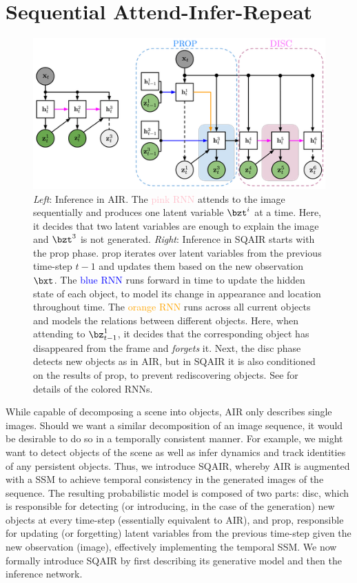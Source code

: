 \section{Sequential Attend-Infer-Repeat}
\label{sec:sqair}

\begin{figure}
    \centering
    \includegraphics[width=.7\linewidth]{figures/SQAIR/air_sqair_inference}
    \caption{
    \textit{Left}: 
        Inference in \gls{AIR}. 
        The \textcolor{pink}{pink \gls{RNN}} attends to the image sequentially and produces one latent variable $\bzt^i$ at a time. 
        Here, it decides that two latent variables are enough to explain the image and $\bzt^3$ is not generated.
    \textit{Right}:
        Inference in \gls{SQAIR} starts with the \gls{prop} phase.
        \gls{prop} iterates over latent variables from the previous time-step $t-1$ and updates them based on the new observation $\bxt$.
        The \textcolor{blue}{blue \gls{RNN}} runs forward in time to update the hidden state of each object, to model its change in appearance and location throughout time. 
        The \textcolor{orange}{orange \gls{RNN}} runs across all current objects and models the relations between different objects.
        Here, when attending to $\bz^1_{t-1}$, it decides that the corresponding object has disappeared from the frame and \textit{forgets} it.
        Next, the \gls{disc} phase detects new objects as in \gls{AIR}, but in \gls{SQAIR} it is also conditioned on the results of \gls{prop}, to prevent rediscovering objects. See  for details of the colored \glspl{RNN}.}
    \label{fig:sqair_inf_flow}
\end{figure}


While capable of decomposing a scene into objects, \gls{AIR} only describes single images. Should we want a similar decomposition of an image sequence, it would be desirable to do so in a temporally consistent manner. For example, we might want to detect objects of the scene as well as infer dynamics and track identities of any persistent objects.
Thus, we introduce   \gls{SQAIR}, whereby \gls{AIR} is augmented with a \gls{SSM} to achieve temporal consistency in the generated images of the sequence.
The resulting probabilistic model is composed of two parts:  \gls{disc}, which is responsible for detecting  (or introducing, in the case of the generation) new objects at every time-step (essentially equivalent to \gls{AIR}), and \gls{prop}, responsible for updating (or forgetting) latent variables from the previous time-step given the new observation (image), effectively implementing the temporal \gls{SSM}.
We now formally introduce \gls{SQAIR} by first describing its generative model and then the inference network.

